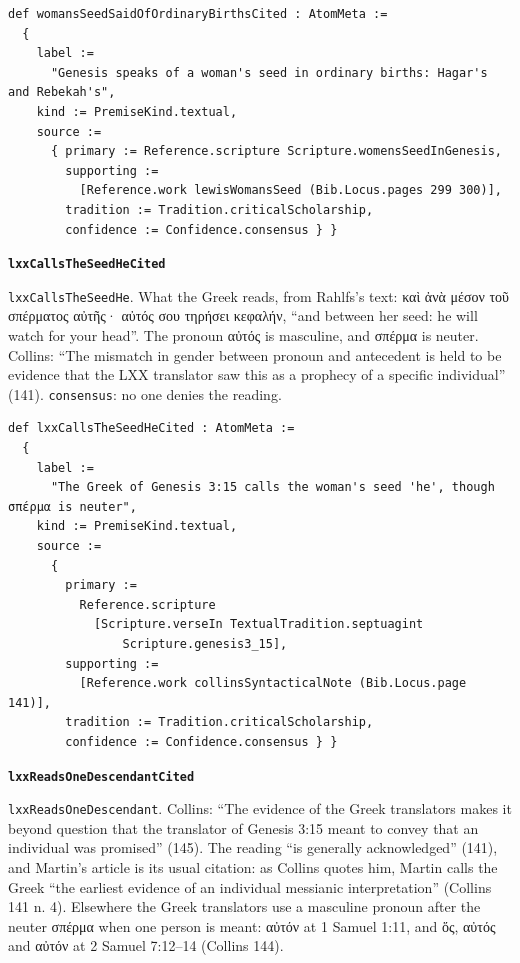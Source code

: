 \documentclass[11pt]{article}
\begin{document}
{\small\begin{verbatim}
def womansSeedSaidOfOrdinaryBirthsCited : AtomMeta :=
  {
    label :=
      "Genesis speaks of a woman's seed in ordinary births: Hagar's and Rebekah's",
    kind := PremiseKind.textual,
    source :=
      { primary := Reference.scripture Scripture.womensSeedInGenesis,
        supporting :=
          [Reference.work lewisWomansSeed (Bib.Locus.pages 299 300)],
        tradition := Tradition.criticalScholarship,
        confidence := Confidence.consensus } }
\end{verbatim}}
\par\medskip\noindent\textbf{\texttt{lxx\allowbreak{}Calls\allowbreak{}The\allowbreak{}Seed\allowbreak{}He\allowbreak{}Cited}}\par\nobreak\noindent
\texttt{lxx\allowbreak{}Calls\allowbreak{}The\allowbreak{}Seed\allowbreak{}He}. What the Greek reads, from Rahlfs’s text: καὶ ἀνὰ μέσον τοῦ σπέρματος αὐτῆς· αὐτός σου τηρήσει κεφαλήν, “and between her seed: he will watch for your head”. The pronoun αὐτός is masculine, and σπέρμα is neuter. Collins: “The mismatch in gender between pronoun and antecedent is held to be evidence that the LXX translator saw this as a prophecy of a specific individual” (141). \texttt{consensus}: no one denies the reading.

{\small\begin{verbatim}
def lxxCallsTheSeedHeCited : AtomMeta :=
  {
    label :=
      "The Greek of Genesis 3:15 calls the woman's seed 'he', though σπέρμα is neuter",
    kind := PremiseKind.textual,
    source :=
      {
        primary :=
          Reference.scripture
            [Scripture.verseIn TextualTradition.septuagint
                Scripture.genesis3_15],
        supporting :=
          [Reference.work collinsSyntacticalNote (Bib.Locus.page 141)],
        tradition := Tradition.criticalScholarship,
        confidence := Confidence.consensus } }
\end{verbatim}}
\par\medskip\noindent\textbf{\texttt{lxx\allowbreak{}Reads\allowbreak{}One\allowbreak{}Descendant\allowbreak{}Cited}}\par\nobreak\noindent
\texttt{lxx\allowbreak{}Reads\allowbreak{}One\allowbreak{}Descendant}. Collins: “The evidence of the Greek translators makes it beyond question that the translator of Genesis 3:15 meant to convey that an individual was promised” (145). The reading “is generally acknowledged” (141), and Martin’s article is its usual citation: as Collins quotes him, Martin calls the Greek “the earliest evidence of an individual messianic interpretation” (Collins 141 n. 4). Elsewhere the Greek translators use a masculine pronoun after the neuter σπέρμα when one person is meant: αὐτόν at 1 Samuel 1:11, and ὅς, αὐτός and αὐτόν at 2 Samuel 7:12–14 (Collins 144).
\end{document}
